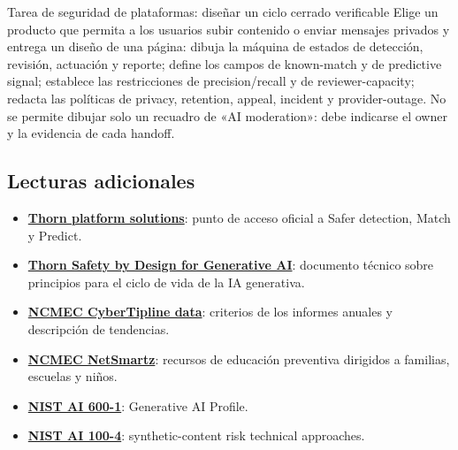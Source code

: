 \begin{importantbox}{Tarea de seguridad de plataformas: diseñar un ciclo cerrado verificable}
Elige un producto que permita a los usuarios subir contenido o enviar mensajes privados y entrega un diseño de una página: dibuja la máquina de estados de detección, revisión, actuación y reporte; define los campos de known-match y de predictive signal; establece las restricciones de precision/recall y de reviewer-capacity; redacta las políticas de privacy, retention, appeal, incident y provider-outage. No se permite dibujar solo un recuadro de «AI moderation»: debe indicarse el owner y la evidencia de cada handoff.
\end{importantbox}

\subsection{Lecturas adicionales}

{\small
\begin{itemize}[nosep,leftmargin=*]
  \item \href{https://www.thorn.org/solutions/for-platforms/}{\textbf{Thorn platform solutions}}: punto de acceso oficial a Safer detection, Match y Predict.
  \item \href{https://info.thorn.org/hubfs/thorn-safety-by-design-for-generative-AI.pdf}{\textbf{Thorn Safety by Design for Generative AI}}: documento técnico sobre principios para el ciclo de vida de la IA generativa.
  \item \href{https://www.missingkids.org/gethelpnow/cybertipline/cybertiplinedata}{\textbf{NCMEC CyberTipline data}}: criterios de los informes anuales y descripción de tendencias.
  \item \href{https://www.missingkids.org/netsmartz/home}{\textbf{NCMEC NetSmartz}}: recursos de educación preventiva dirigidos a familias, escuelas y niños.
  \item \href{https://nvlpubs.nist.gov/nistpubs/ai/NIST.AI.600-1.pdf}{\textbf{NIST AI 600-1}}: Generative AI Profile.
  \item \href{https://nvlpubs.nist.gov/nistpubs/ai/NIST.AI.100-4.pdf}{\textbf{NIST AI 100-4}}: synthetic-content risk technical approaches.
\end{itemize}
}


